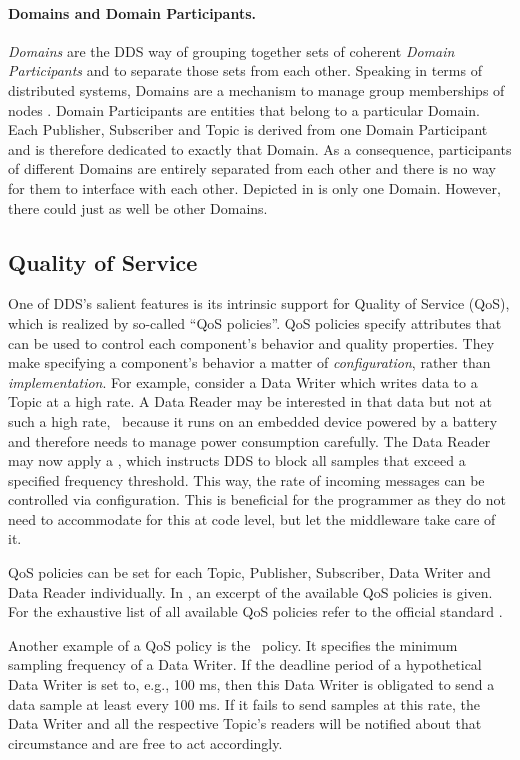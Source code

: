 \paragraph{Domains and Domain Participants.}
\emph{Domains} are the DDS way of grouping together sets of coherent \emph{Domain Participants} and to separate those sets from each other. Speaking in terms of distributed systems, Domains are a mechanism to manage group memberships of nodes \cite{tanenbaum2017distributed}. Domain Participants are entities that belong to a particular Domain. Each Publisher, Subscriber and Topic is derived from one Domain Participant and is therefore dedicated to exactly that Domain. As a consequence, participants of different Domains are entirely separated from each other and there is no way for them to interface with each other. Depicted in  is only one Domain. However, there could just as well be other Domains.
\pagebreak
\subsection{Quality of Service}
One of DDS's salient features is its intrinsic support for Quality of Service (QoS), which is realized by so-called ``QoS policies''. QoS policies specify attributes that can be used to control each component's behavior and quality properties. They make specifying a component's behavior a matter of \emph{configuration}, rather than \emph{implementation}. For example, consider a Data Writer which writes data to a Topic at a high rate. A Data Reader may be interested in that data but not at such a high rate, \eg\ because it runs on an embedded device powered by a battery and therefore needs to manage power consumption carefully. The Data Reader may now apply a \tbf , which instructs DDS to block all samples that exceed a specified frequency threshold. This way, the rate of incoming messages can be controlled via configuration. This is beneficial for the programmer as they do not need to accommodate for this at code level, but let the middleware take care of it.

QoS policies can be set for each Topic, Publisher, Subscriber, Data Writer and Data Reader individually.
In , an excerpt of the available QoS policies is given. For the exhaustive list of all available QoS policies refer to the official standard \cite{dds-1.4-standard}.

Another example of a QoS policy is the \deadline\ policy. It specifies the minimum sampling frequency of a Data Writer. If the deadline period of a hypothetical Data Writer is set to, e.g., 100 ms, then this Data Writer is obligated to send a data sample at least every 100 ms. If it fails to send samples at this rate, the Data Writer and all the respective Topic's readers will be notified about that circumstance and are free to act accordingly.

